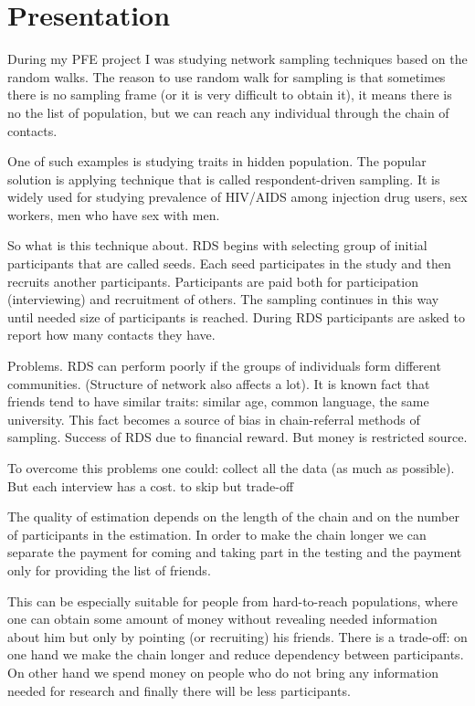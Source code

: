 \documentclass[12pt]{report}
\begin{document}
\chapter{Presentation}


During my PFE project I was studying network sampling techniques based on the random walks. The reason to use random walk for sampling is that sometimes there is no sampling frame (or it is very difficult to obtain it), it means there is no the list of population, but we can reach any individual through the chain of contacts. 

One of such examples is studying traits in hidden population. The popular solution is applying technique that is called respondent-driven sampling. It is widely used for studying prevalence of HIV/AIDS among injection drug users, sex workers, men who have sex with men.  

So what is this technique about.
RDS begins with selecting group of initial participants that are called seeds. Each seed participates in the study and then recruits another participants. Participants are paid both for participation (interviewing) and recruitment of others. The sampling continues in this way until needed size of participants is reached. During RDS participants are asked to report how many contacts they have.

Problems.
RDS can perform poorly if the groups of individuals form different communities. (Structure of network also affects a lot). 
It is known fact that friends tend to have similar traits: similar age, common language, the same university. This fact becomes a source of bias in chain-referral methods of sampling. 
Success of RDS due to financial reward. But money is restricted source. 

To overcome this problems one could:
collect all the data (as much as possible). But each interview has a cost.
to skip
but trade-off

The quality of estimation depends on the length of the chain and on the number of participants in the estimation.
In order to make the chain longer we can separate the payment for coming and taking part in the testing and the payment only for providing the list of friends.

This can be especially suitable for people from hard-to-reach populations, where one can obtain some amount of money without revealing needed information about him but only by pointing (or recruiting) his friends. There is a trade-off: on one hand we make the chain longer and reduce dependency between participants. On other hand we spend money on people who do not bring any information needed for research and finally there will be less participants. 
\end{document}

